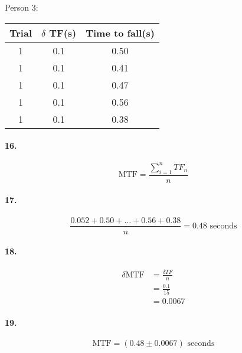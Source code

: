 \begin{center}
        Person 3:
        \begin{tabular}{| c | c | c |}
            \hline
            Trial & $\delta$ TF(s) & Time to fall(s)        \\
            \hline
            1 & 0.1 & 0.50                                  \\
            \hline
            1 & 0.1 & 0.41                                  \\
            \hline
            1 & 0.1 & 0.47                                  \\
            \hline
            1 & 0.1 & 0.56                                  \\
            \hline
            1 & 0.1 & 0.38                                  \\
            \hline
        \end{tabular}
    \end{center}

    \paragraph*{16.}
    \begin{equation*}
        \text{MTF} = \frac{\sum_{i=1}^{n}TF_n}{n}
    \end{equation*}

    \paragraph*{17.}
    \begin{equation*}
        \frac{0.052 + 0.50 + \dots + 0.56 + 0.38}{n} = \boxed{0.48 \text{ seconds}}
    \end{equation*}

    \paragraph*{18.}
    \begin{align*}
        \delta \text{MTF}   & = \frac{\delta TF}{n} \\
                            & = \frac{0.1}{15}      \\
                            & = \boxed{0.0067}
    \end{align*}

    \paragraph*{19.}
    \begin{equation*}
        \text{MTF} = \boxed{(0.48 \pm 0.0067) \text{ seconds}}
    \end{equation*}

